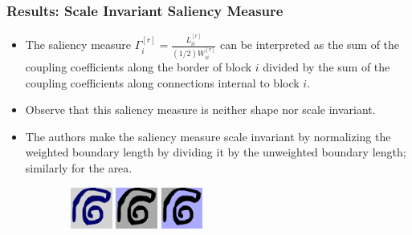 \documentclass[8pt]{beamer}
\begin{document}
\begin{frame}
\frametitle{Results: Scale Invariant Saliency Measure}

\begin{itemize}
\item The saliency measure $\displaystyle{\Gamma_i^{[r]} = \frac{L_{ii}^{[r]}}{(1/2)W_{ii}^{[r]}}}$ can be interpreted as the sum of the coupling coefficients along the border of block $i$ divided by the sum of the coupling coefficients along connections internal to block $i$. 
\item Observe that this saliency measure is neither shape nor scale invariant.
\item The authors make the saliency measure scale invariant by normalizing the weighted boundary length by dividing it by the unweighted boundary length; similarly for the area.
\end{itemize}

\begin{figure}[ht]

\begin{subfigure}[b]{\textwidth}
\centering
\includegraphics[width=0.15\textwidth,height=0.15\textwidth]{spiral_bad_seg_1.png} \hspace{.45cm}
\includegraphics[width=0.15\textwidth,height=0.15\textwidth]{spiral_bad_seg_2.png} \hspace{.45cm}
\includegraphics[width=0.15\textwidth,height=0.15\textwidth]{spiral_bad_seg_3.png}
\end{subfigure}

\vspace{.45cm}


\end{figure}
\end{frame}
\end{document}
